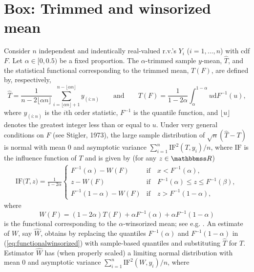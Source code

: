 \documentclass[a4paper,11pt]{scrreprt}
\theoremstyle{remark}
\begin{document}
\section{Box: Trimmed and winsorized mean}
Consider $n$ independent and indentically real-valued r.v.'s $Y_i$ ($i=1,\ldots,n$) with cdf $F$. Let $\alpha \in [0, 0.5)$ be a fixed proportion. The $\alpha$-trimmed sample $y$-mean, $\widehat{T}$, and the statistical functional corresponding to the trimmed mean, $T(F)$, are defined by, respectively, 
\begin{equation*}
   \widehat{T} = \frac{1}{n-2\lfloor \alpha n\rfloor}\sum_{i=\lfloor \alpha n\rfloor + 1}^{n - \lfloor \alpha n\rfloor}y_{(i:n)} \qquad  \text{and} \qquad  T(F) = \frac{1}{1 - 2\alpha} \int_{\alpha}^{1-\alpha} u \mathrm{d} F^{-1}(u), 
\end{equation*}
\noindent where $y_{(i:n)}$ is the $i$th order statistic, $F^{-1}$ is the quantile function, and $\lfloor u \rfloor$ denotes the greatest integer less than or equal to $u$. Under very general conditions on $F$ (see Stigler, 1973), the large sample distribution of $\sqrt{n}(\widehat{T} - T)$ is normal with mean 0 and asymptotic variance $\sum_{i=1}^n \mathrm{IF}^2(T,y_i)/n$, where $\mathrm{IF}$ is the influence function of $T$ and is given by (for any $z \in \R$) 
\begin{align*}
   \mathrm{IF}\big(T, z\big) = \frac{1}{1-2\alpha}
   \begin{cases}
      F^{-1}(\alpha) - W(F) & \text{if} \quad x < F^{-1}(\alpha),\\
      z - W(F) & \text{if} \quad F^{-1}(\alpha) \leq z \leq F^{-1}(\beta),\\
      F^{-1}(1-\alpha) - W(F) & \text{if} \quad z > F^{-1}(1-\alpha), 
   \end{cases}
\end{align*}
\noindent where
\begin{equation}\label{eq:functionalwinsorized}
   W(F) = (1 - 2\alpha )T(F) + \alpha F^{-1}(\alpha) + \alpha F^{-1}(1-\alpha)
\end{equation}
\noindent is the functional corresponding to the $\alpha$-winsorized mean; see e.g. \citet[][p. 58]{huber1981}. An estimate of $W$, say $\widehat{W}$, obtains by replacing the quantiles $F^{-1}(\alpha)$ and $F^{-1}(1-\alpha)$ in (\ref{eq:functionalwinsorized}) with sample-based quantiles and substituting $\widehat{T}$ for $T$. Estimator $\widehat{W}$ has (when properly scaled) a limiting normal distribution with mean 0 and asymptotic variance $\sum_{i=1}^n \mathrm{IF}^2(W,y_i) / n$, where \citep[see e.g.][58--59]{huber1981}
\end{document}
